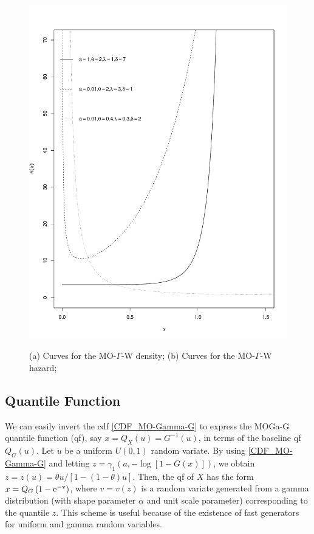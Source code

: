 \documentclass[12pt,a4paper]{article} %
\begin{document}
\begin{figure}[h!]
\begin{center}
\includegraphics[scale=.3]{hazard.pdf}\\
\vspace{-0.5cm}
\caption{(a) Curves for the MO-$\Gamma$-W density; (b) Curves for the MO-$\Gamma$-W hazard;\label{formas}}
\end{center}
\end{figure}

\subsection{Quantile Function}\label{QuantFunc}

We can easily invert the cdf \eqref{CDF_MO-Gamma-G} to express the MOGa-G
quantile function (qf), say $x=Q_{X}(u)=G^{-1}(u)$, in terms of the baseline 
qf $Q_G(u)$. Let $u$ be a uniform $U(0,1)$ random variate. By using \eqref{CDF_MO-Gamma-G}
and letting $z=\gamma_{1}\left(a, -\log[1-G(x)]\right)$, we obtain $z=z(u)=\theta u/[1-(1-\theta)u]$. 
Then, the qf of $X$ has the form $x=Q_G\left(1-\rm{e}^{-v}\right)$, where $v=v(z)$ is a random variate generated
from a gamma distribution (with shape parameter $\alpha$ and unit scale parameter) corresponding to the quantile $z$. 
This scheme is useful because of the existence of fast generators for uniform and gamma 
random variables.
\end{document}
